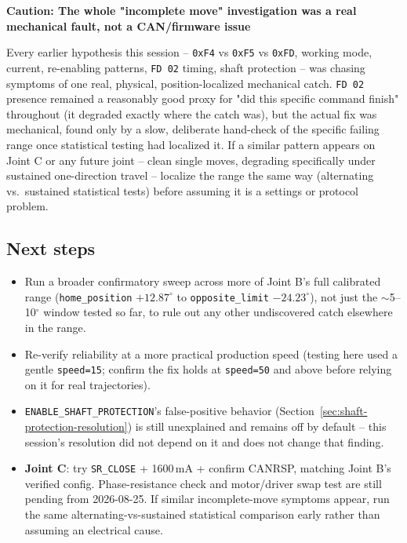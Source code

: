 \documentclass[11pt,letterpaper]{article}
\newenvironment{caution}[1]{%
    \par\addvspace{8pt}%
    \noindent{\color{cautionred}\rule{\linewidth}{0.8pt}}\par\vspace{2pt}
    \noindent\textbf{\color{cautionred}Caution: #1}\par\vspace{2pt}
}{%
    \par\vspace{2pt}\noindent{\color{cautionred}\rule{\linewidth}{0.4pt}}%
    \par\addvspace{8pt}%
}
\begin{document}
\begin{caution}{The whole "incomplete move" investigation was a real mechanical fault, not a CAN/firmware issue}
Every earlier hypothesis this session -- \texttt{0xF4} vs \texttt{0xF5} vs \texttt{0xFD}, working mode, current, re-enabling patterns, \texttt{FD 02} timing, shaft protection -- was chasing symptoms of one real, physical, position-localized mechanical catch. \texttt{FD 02} presence remained a reasonably good proxy for "did this specific command finish" throughout (it degraded exactly where the catch was), but the actual fix was mechanical, found only by a slow, deliberate hand-check of the specific failing range once statistical testing had localized it. If a similar pattern appears on Joint C or any future joint -- clean single moves, degrading specifically under sustained one-direction travel -- localize the range the same way (alternating vs.\ sustained statistical tests) before assuming it is a settings or protocol problem.
\end{caution}

\subsection{Next steps}
\begin{itemize}
    \item Run a broader confirmatory sweep across more of Joint B's full calibrated range (\texttt{home\_position} $+12.87^\circ$ to \texttt{opposite\_limit} $-24.23^\circ$), not just the $\sim$5--10$^\circ$ window tested so far, to rule out any other undiscovered catch elsewhere in the range.
    \item Re-verify reliability at a more practical production speed (testing here used a gentle \texttt{speed=15}; confirm the fix holds at \texttt{speed=50} and above before relying on it for real trajectories).
    \item \texttt{ENABLE\_SHAFT\_PROTECTION}'s false-positive behavior (Section~\ref{sec:shaft-protection-resolution}) is still unexplained and remains off by default -- this session's resolution did not depend on it and does not change that finding.
    \item \textbf{Joint C}: try \texttt{SR\_CLOSE} + 1600\,mA + confirm CANRSP, matching Joint B's verified config. Phase-resistance check and motor/driver swap test are still pending from 2026-08-25. If similar incomplete-move symptoms appear, run the same alternating-vs-sustained statistical comparison early rather than assuming an electrical cause.
\end{itemize}
\end{document}

